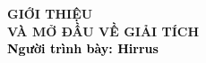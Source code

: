 \begin{frame}[noframenumbering]
    \thispagestyle{empty}
    \bfseries
    \begin{flushleft}
        \vfill
        \vspace{5mm}
        \textcolor{BlueDefault}{\huge \bfseries GIỚI THIỆU   \\ VÀ MỞ ĐẦU VỀ  GIẢI TÍCH} \\
        \vspace{8mm}
        \textcolor{black}{\large \bfseries Người trình bày: Hirrus }
        \vfill
    \end{flushleft}
\end{frame}